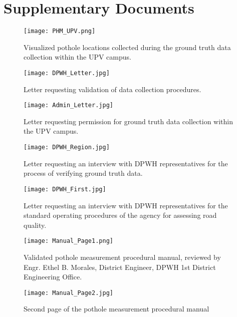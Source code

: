 \chapter{Supplementary Documents}
\label{sec:appendixd}

\begin{figure}[htbp]
	\centering
	\texttt{[image: PHM\_UPV.png]}
	\caption{Visualized pothole locations collected during the ground truth data collection within the UPV campus.}
	\label{fig:pothole_map}
\end{figure}

\begin{figure}[htbp]
	\centering
	\texttt{[image: DPWH\_Letter.jpg]}
	\caption{Letter requesting validation of data collection procedures.}
	\label{fig:validation_letter}
\end{figure}

\begin{figure}[htbp]
	\centering
	\texttt{[image: Admin\_Letter.jpg]}
	\caption{Letter requesting permission for ground truth data collection within the UPV campus.}
	\label{fig:permission_letter}
\end{figure}

\begin{figure}[htbp]
	\centering
	\texttt{[image: DPWH\_Region.jpg]}
	\caption{Letter requesting an interview with DPWH representatives for the process of verifying ground truth data.}
	\label{fig:regional_letter}
\end{figure}

\begin{figure}[htbp]
	\centering
	\texttt{[image: DPWH\_First.jpg]}
	\caption{Letter requesting an interview with DPWH representatives for the standard operating procedures of the agency for assessing road quality.}
	\label{fig:interview_letter}
\end{figure}

\begin{figure}[htbp]
	\centering
	\texttt{[image: Manual\_Page1.png]}
	\caption{Validated pothole measurement procedural manual, reviewed by Engr. Ethel B. Morales, District Engineer, DPWH 1st District Engineering Office.}
	\label{fig:manual_page1}
\end{figure}

\begin{figure}[htbp]
	\centering
	\texttt{[image: Manual\_Page2.jpg]}
	\caption{Second page of the pothole measurement procedural manual}
	\label{fig:manual_page2}
\end{figure}

